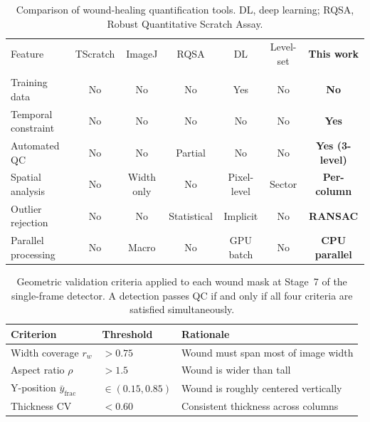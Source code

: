 \begin{table}[H]
\centering
\caption{Comparison of wound-healing quantification tools.
  DL, deep learning; RQSA, Robust Quantitative Scratch Assay.}
\label{tab:tool-comparison}
\small
\begin{tabular}{lcccccc}
\toprule
Feature & TScratch & ImageJ & RQSA & DL & Level-set & \textbf{This work} \\
        & \citep{Gebaeck2009} & \citep{Suarez2020} & \citep{Vargas2016} & \citep{Dogru2024} & \citep{Martinotti2025} & \\
\midrule
Training data       & No  & No         & No        & Yes         & No        & \textbf{No} \\
Temporal constraint & No  & No         & No        & No          & No        & \textbf{Yes} \\
Automated QC        & No  & No         & Partial   & No          & No        & \textbf{Yes (3-level)} \\
Spatial analysis    & No  & Width only & No        & Pixel-level & Sector    & \textbf{Per-column} \\
Outlier rejection   & No  & No         & Statistical & Implicit  & No        & \textbf{RANSAC} \\
Parallel processing & No  & Macro      & No        & GPU batch   & No        & \textbf{CPU parallel} \\
\bottomrule
\end{tabular}
\end{table}

\begin{table}[H]
\centering
\caption{Geometric validation criteria applied to each wound mask at Stage~7 of the
  single-frame detector. A detection passes QC if and only if all four criteria
  are satisfied simultaneously.}
\label{tab:qc-criteria}
\begin{tabular}{llp{6.5cm}}
\toprule
Criterion & Threshold & Rationale \\
\midrule
Width coverage $r_w$                   & $> 0.75$           & Wound must span most of image width \\
Aspect ratio $\rho$                    & $> 1.5$            & Wound is wider than tall \\
Y-position $\bar{y}_\text{frac}$       & $\in (0.15, 0.85)$ & Wound is roughly centered vertically \\
Thickness CV                           & $< 0.60$           & Consistent thickness across columns \\
\bottomrule
\end{tabular}
\end{table}

